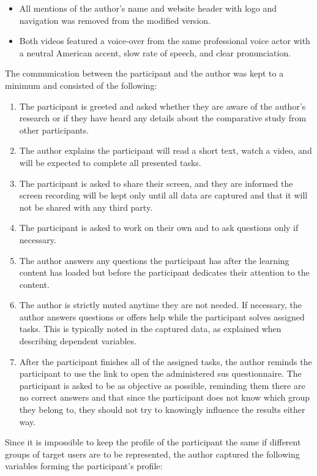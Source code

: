 \begin{itemize}
    \item All mentions of the author's name and website header with logo and navigation was removed from the modified version.
    \item Both videos featured a voice-over from the same professional voice actor with a neutral American accent, slow rate of speech, and clear pronunciation.
\end{itemize}

The communication between the participant and the author was kept to a minimum and consisted of the following:

\begin{enumerate}
    \item The participant is greeted and asked whether they are aware of the author's research or if they have heard any details about the comparative study from other participants.
    \item The author explains the participant will read a short text, watch a video, and will be expected to complete all presented tasks.
    \item The participant is asked to share their screen, and they are informed the screen recording will be kept only until all data are captured and that it will not be shared with any third party.
    \item The participant is asked to work on their own and to ask questions only if necessary.
    \item The author answers any questions the participant has after the learning content has loaded but before the participant dedicates their attention to the content.
    \item The author is strictly muted anytime they are not needed. If necessary, the author answers questions or offers help while the participant solves assigned tasks. This is typically noted in the captured data, as explained when describing dependent variables.
    \item After the participant finishes all of the assigned tasks, the author reminds the participant to use the link to open the administered \gls{sus} questionnaire. The participant is asked to be as objective as possible, reminding them there are no correct answers and that since the participant does not know which group they belong to, they should not try to knowingly influence the results either way.
\end{enumerate}

Since it is impossible to keep the profile of the participant the same if different groups of target users are to be represented, the author captured the following variables forming the participant's profile:

